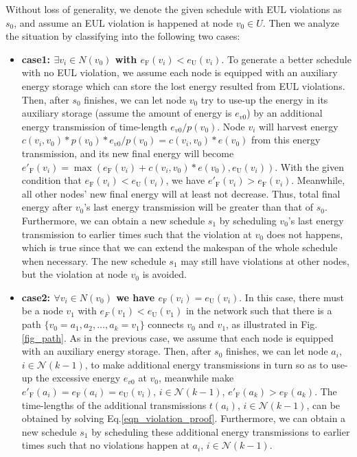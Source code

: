 \documentclass[journal,10pt]{IEEEtran}
\begin{document}
\begin{IEEEproof}
Without loss of generality, we denote the given schedule with EUL violations as $s_0$, and assume an EUL violation is happened at node $v_0{\in}U$. Then we analyze the situation by classifying into the following two cases:

\begin{itemize}
\item{\textbf{case1: ${\exists}v_i{\in}N(v_0)$ with $e_\text{F}(v_i){<}e_\text{U}(v_i)$}}.
To generate a better schedule with no EUL violation, we assume each node is equipped with an auxiliary energy storage which can store the lost energy resulted from EUL violations. Then, after $s_0$ finishes, we can let node $v_0$ try to use-up the energy in its auxiliary storage (assume the amount of energy is $e_{v0}$) by an additional energy transmission of time-length $e_{v0}/p(v_0)$. Node $v_i$ will harvest energy $c(v_i,v_0){*}p(v_0)*{e_{v0}{/}p(v_0)}{=}c(v_i,v_0){*}e(v_0)$ from this energy transmission, and its new final energy will become $e'_\text{F}(v_i){=}\max(e_\text{F}(v_i){+}c(v_i,v_0){*}e(v_0),e_\text{U}(v_i))$. With the given condition that $e_\text{F}(v_i){<}e_\text{U}(v_i)$, we have $e'_\text{F}(v_i){>}e_\text{F}(v_i)$. Meanwhile, all other nodes' new final energy will at least not decrease. Thus, total final energy after $v_0$'s last energy transmission will be greater than that of $s_0$. Furthermore, we can obtain a new schedule $s_1$ by scheduling $v_0$'s last energy transmission to earlier times such that the violation at $v_0$ does not happens, which is true since that we can extend the makespan of the whole schedule when necessary. The new schedule $s_1$ may still have violations at other nodes, but the violation at node $v_0$ is avoided.

\item{\textbf{case2: ${\forall}v_i{\in}N(v_0)$ we have $e_\text{F}(v_i){=}e_\text{U}(v_i)$}}.
In this case, there must be a node $v_1$ with $e_F(v_1){<}e_\text{U}(v_1)$ in the network such that there is a path $\{v_0{=}a_1,a_2,\ldots,a_k{=}v_1\}$ connects $v_0$ and $v_1$, as illustrated in Fig.\ref{fig_path}. As in the previous case, we assume that each node is equipped with an auxiliary energy storage. Then, after $s_0$ finishes, we can let node $a_i$,$i{\in}\mathcal{N}(k{-}1)$, to make additional energy transmissions in turn so as to use-up the excessive energy $e_{v0}$ at $v_0$, meanwhile make $e'_\text{F}(a_i){=}e_\text{F}(a_i){=}e_\text{U}(v_i)$, $i{\in}\mathcal{N}(k{-}1)$, $e'_\text{F}(a_k){>}e_\text{F}(a_k)$. The time-lengths of the additional transmissions $t(a_i)$, $i{\in}\mathcal{N}(k{-}1)$, can be obtained by solving Eq.\eqref{eqn_violation_proof}. Furthermore, we can obtain a new schedule $s_1$ by scheduling these additional energy transmissions to earlier times such that no violations happen at $a_i$, $i{\in}\mathcal{N}(k{-}1)$.


\end{itemize}
\end{IEEEproof}
\end{document}
